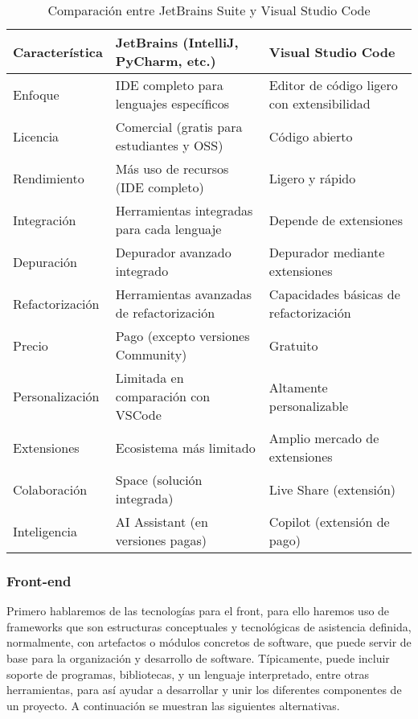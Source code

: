 \begin{table}[h]
	\centering

	\begin{tabular}{|>{\raggedright}p{3cm}|p{4cm}|p{4cm}|} 
		\hline
		\textbf{Característica} & \textbf{JetBrains (IntelliJ, PyCharm, etc.)} & \textbf{Visual Studio Code} \\ \hline
		Enfoque & IDE completo para lenguajes específicos & Editor de código ligero con extensibilidad \\ \hline
		Licencia & Comercial (gratis para estudiantes y OSS) & Código abierto \\ \hline
		Rendimiento & Más uso de recursos (IDE completo) & Ligero y rápido \\ \hline
		Integración & Herramientas integradas para cada lenguaje & Depende de extensiones \\ \hline
		Depuración & Depurador avanzado integrado & Depurador mediante extensiones \\ \hline
		Refactorización & Herramientas avanzadas de refactorización & Capacidades básicas de refactorización \\ \hline
		Precio & Pago (excepto versiones Community) & Gratuito \\ \hline
		Personalización & Limitada en comparación con VSCode & Altamente personalizable \\ \hline
		Extensiones & Ecosistema más limitado & Amplio mercado de extensiones \\ \hline
		Colaboración & Space (solución integrada) & Live Share (extensión) \\ \hline
		Inteligencia & AI Assistant (en versiones pagas) & Copilot (extensión de pago) \\ \hline
	\end{tabular}
		\caption{Comparación entre JetBrains Suite y Visual Studio Code}
\end{table}


\subsubsection{Front-end}

Primero hablaremos de las tecnologías para el front, para ello haremos uso de frameworks \cite{framework} que son estructuras conceptuales y tecnológicas de asistencia definida, normalmente, con artefactos o módulos concretos de software, que puede servir de base para la organización y desarrollo de software. Típicamente, puede incluir soporte de programas, bibliotecas, y un lenguaje interpretado, entre otras herramientas, para así ayudar a desarrollar y unir los diferentes componentes de un proyecto. A continuación se muestran las siguientes alternativas.

